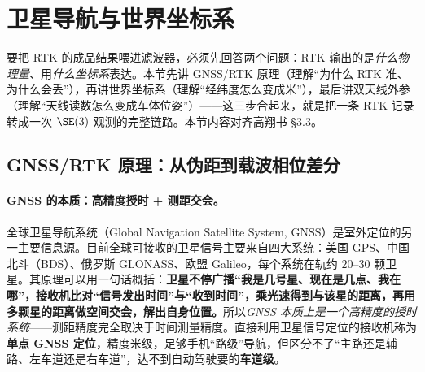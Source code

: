 \section{卫星导航与世界坐标系}
\label{sec:gins-gnss}

要把 RTK 的成品结果喂进滤波器，必须先回答两个问题：RTK 输出的是\emph{什么物理量}、用\emph{什么坐标系}表达。本节先讲 GNSS/RTK 原理（理解“为什么 RTK 准、为什么会丢”），再讲世界坐标系（理解“经纬度怎么变成米”），最后讲双天线外参（理解“天线读数怎么变成车体位姿”）——这三步合起来，就是把一条 RTK 记录转成一次 $\SE(3)$ 观测的完整链路。本节内容对齐高翔书 §3.3\cite{gao2023slamad}。

\subsection{GNSS/RTK 原理：从伪距到载波相位差分}
\label{sec:gins-rtk}

\paragraph{GNSS 的本质：高精度授时 + 测距交会。}
全球卫星导航系统（Global Navigation Satellite System, GNSS）是室外定位的另一主要信息源。目前全球可接收的卫星信号主要来自四大系统：美国 GPS、中国北斗（BDS）、俄罗斯 GLONASS、欧盟 Galileo，每个系统在轨约 $20$–$30$ 颗卫星\cite{gao2023slamad}。其原理可以用一句话概括：\textbf{卫星不停广播“我是几号星、现在是几点、我在哪”，接收机比对“信号发出时间”与“收到时间”，乘光速得到与该星的距离，再用多颗星的距离做空间交会，解出自身位置。}所以\emph{GNSS 本质上是一个高精度的授时系统}——测距精度完全取决于时间测量精度。直接利用卫星信号定位的接收机称为\textbf{单点 GNSS 定位}，精度米级，足够手机“路级”导航，但区分不了“主路还是辅路、左车道还是右车道”，达不到自动驾驶要的\textbf{车道级}\cite{gao2023slamad}。


